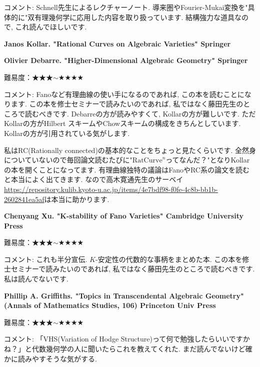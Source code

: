 コメント: Schnell先生によるレクチャーノート. 導来圏やFourier-Mukai変換を"具体的に"双有理幾何学に応用した内容を取り扱っています. 結構強力な道具なので, これ読んでほしいです. 
\vspace{8pt}

\textbf{Janos Kollar. "Rational Curves on Algebraic Varieties" Springer} \vspace{-6pt}

\textbf{Olivier Debarre. "Higher-Dimensional Algebraic Geometry" Springer} \vspace{-6pt}

難易度：★★★$\sim$★★★★\vspace{-6pt} 

コメント: Fanoなど有理曲線の使い手になるのであれば, この本を読むことになります. この本を修士セミナーで読みたいのであれば, 私ではなく藤田先生のところで読むべきです. 
Debarreの方が読みやすくて, Kollarの方が難しいです. ただKollarの方がHilbert スキームやChowスキームの構成をきちんとしています. Kollarの方が引用されている気がします.

私はRC(Rationally connected)の基本的なことをちょっと見たくらいです. 全然身についていないので毎回論文読むたびに"$\mathrm{RatCurve}^{n}$ってなんだ？"となりKollarの本を開くことになってます. 有理曲線独特の議論はFanoやRC系の論文を読むと本当によく出てきます. 
なので高木寛通先生のサーベイ\url{https://repository.kulib.kyoto-u.ac.jp/items/4e7bdf98-f0fe-4c8b-bb1b-2602841ea5af}は本当に助かります. 
 \vspace{8pt}
 
 \textbf{Chenyang Xu. "K-stability of Fano Varieties" Cambridge University Press} \vspace{-6pt}

難易度：★★★$\sim$★★★★\vspace{-6pt} 

コメント: これも半分宣伝. $K$-安定性の代数的な事柄をまとめた本. この本を修士セミナーで読みたいのであれば, 私ではなく藤田先生のところで読むべきです. 私は読んでないです. 
 \vspace{8pt}
 
  \textbf{Phillip A. Griffiths. "Topics in Transcendental Algebraic Geometry" (Annals of Mathematics Studies, 106) Princeton Univ Press} \vspace{-6pt}

難易度：★★★$\sim$★★★★\vspace{-6pt} 

コメント: 「VHS(Variation of Hodge Structure)って何で勉強したらいいですかね？」と代数幾何学の人に聞いたらこれを教えてくれた. まだ読んでないけど確かに読みやすそうな気がする. 
 \vspace{8pt}
 

